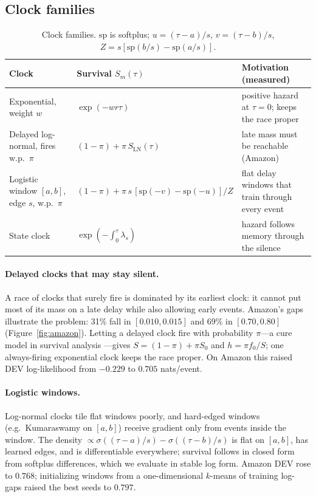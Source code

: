 \documentclass[11pt]{article}
\begin{document}
\subsection{Clock families}
\begin{table}[h]
\centering\small
\begin{tabular}{@{}p{4.0cm}p{5.2cm}p{5.0cm}@{}}
\toprule
Clock & Survival $S_m(\tau)$ & Motivation (measured) \\
\midrule
Exponential, weight $w$ & $\exp(-w r\tau)$ & positive hazard at $\tau=0$; keeps the race proper \\
Delayed log-normal, fires w.p.\ $\pi$ & $(1-\pi)+\pi\,S_{\mathrm{LN}}(\tau)$ & late mass must be reachable (Amazon) \\
Logistic window $[a,b]$, edge $s$, w.p.\ $\pi$ & $(1-\pi)+\pi\, s\,[\mathrm{sp}(-v)-\mathrm{sp}(-u)]/Z$ & flat delay windows that train through every event \\
State clock & $\exp(-\int_0^\tau\lambda_s)$ & hazard follows memory through the silence \\
\bottomrule
\end{tabular}
\caption{Clock families. $\mathrm{sp}$ is softplus; $u=(\tau-a)/s$, $v=(\tau-b)/s$, $Z=s[\mathrm{sp}(b/s)-\mathrm{sp}(a/s)]$.}
\label{tab:clocks}
\end{table}

\paragraph{Delayed clocks that may stay silent.} A race of clocks that surely fire is dominated by its earliest clock: it cannot put most of its mass on a late delay while also allowing early events. Amazon's gaps illustrate the problem: 31\% fall in $[0.010,0.015]$ and 69\% in $[0.70,0.80]$ (Figure~\ref{fig:amazon}). Letting a delayed clock fire with probability $\pi$---a cure model in survival analysis \citep{berkson1952}---gives $S=(1-\pi)+\pi S_0$ and $h=\pi f_0/S$; one always-firing exponential clock keeps the race proper. On Amazon this raised DEV log-likelihood from $-0.229$ to $0.705$ nats/event.

\paragraph{Logistic windows.} Log-normal clocks tile flat windows poorly, and hard-edged windows (e.g.\ Kumaraswamy on $[a,b]$) receive gradient only from events inside the window. The density $\propto\sigma((\tau-a)/s)-\sigma((\tau-b)/s)$ is flat on $[a,b]$, has learned edges, and is differentiable everywhere; survival follows in closed form from softplus differences, which we evaluate in stable log form. Amazon DEV rose to $0.768$; initializing windows from a one-dimensional $k$-means of training log-gaps raised the best seeds to $0.797$.
\end{document}
